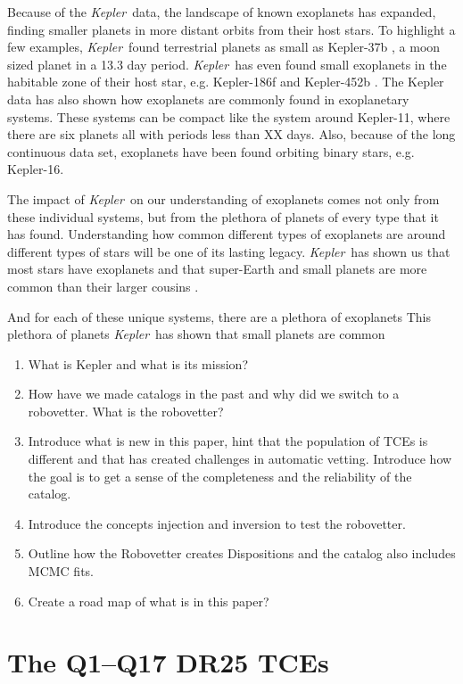 \documentclass[onecolumn]{aastex6}
\newcommand\Kepler{\textit{Kepler}}
\begin{document}
Because of the \Kepler\ data, the landscape of known exoplanets has expanded, finding smaller planets in more distant orbits from their host stars.  To highlight a few examples,  \Kepler\ found terrestrial planets as small as Kepler-37b \citep{Barclay2013}, a moon sized planet in a 13.3 day period. \Kepler\ has even found small exoplanets in the habitable zone of their host star, e.g. Kepler-186f \citep{Quintana2014} and Kepler-452b \citep{Jenkins2015}.  The Kepler data has also shown how exoplanets are commonly found in exoplanetary systems. These systems can be compact like the system around Kepler-11, where there are six planets all with periods less than XX days. Also, because of the long continuous data set, exoplanets have been found orbiting binary stars, e.g. Kepler-16\citep{Doyle2011}.


The impact of \Kepler\ on our understanding of exoplanets comes not only from these individual systems, but from the plethora of planets of every type that it has found. Understanding how common different types of exoplanets are around different types of stars will be one of its lasting legacy. \Kepler\ has shown us that most stars have exoplanets and that super-Earth and small planets are more common than their larger cousins \citet{Burke2015}.  


And for each of these unique systems, there are a plethora of exoplanets This plethora of planets \Kepler\ has shown that small planets are common 

\begin{enumerate}
\item What is Kepler and what is its mission?
\item How have we made catalogs in the past and why did we switch to a robovetter. What is the robovetter?
\item Introduce what is new in this paper, hint that the population of TCEs is different and that has created challenges in automatic vetting. Introduce how the goal is to get a sense of the completeness and the reliability of the catalog.
\item Introduce the concepts injection and inversion to test the robovetter.
\item Outline how the Robovetter creates Dispositions and the catalog also includes MCMC fits.
\item Create a road map of what is in this paper?
\end{enumerate}

\section{The Q1--Q17 DR25 TCEs}

\end{document}

